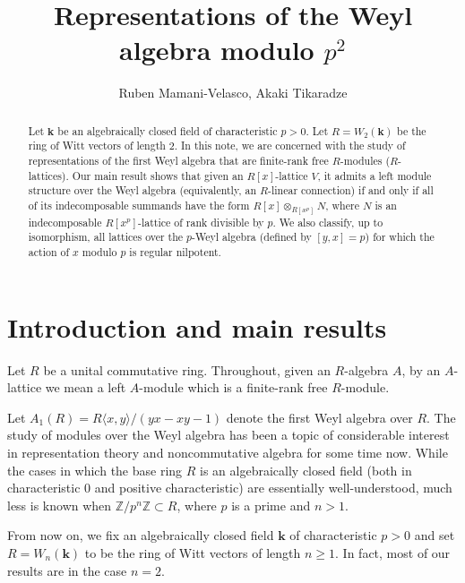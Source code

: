 \documentclass[12pt,letterpaper]{amsart}
\theoremstyle{plain}
\theoremstyle{definition}
\begin{document}
\title{Representations of the Weyl algebra modulo $p^2$}
\author{Ruben Mamani-Velasco, Akaki Tikaradze}
\address{University of Toledo, Department of Mathematics \& Statistics, 
Toledo, OH 43606, USA}

\begin{abstract}
Let $\mathbf{k}$ be an algebraically closed field of characteristic $p>0$. Let $R=W_2(\mathbf{k})$ be the ring of Witt vectors of length $2$.
In this note, we are concerned with the study of representations of the first Weyl algebra that are finite-rank free
$R$-modules ($R$-lattices). 
Our main result shows that given an $R[x]$-lattice $V$, it admits a left module structure over
the Weyl algebra (equivalently, an $R$-linear connection) if and only if all of its indecomposable summands have 
the form $R[x]\otimes_{R[x^p]}N$, where $N$ is an indecomposable $R[x^p]$-lattice of rank divisible by $p$.  
 We also classify, up to isomorphism, all lattices over
the $p$-Weyl algebra (defined by $[y,x]=p$) for which the action of $x$ modulo $p$ is regular nilpotent.
\end{abstract}

\maketitle

\section{Introduction and main results}
Let $R$ be a unital commutative ring. Throughout, given an $R$-algebra $A$, by an $A$-lattice we mean a left $A$-module which is a finite-rank free $R$-module.

Let $A_1(R)=R\langle x,y\rangle/(yx-xy-1)$ denote the first Weyl algebra over $R$. The study of modules over the Weyl algebra has been a topic of considerable interest in representation theory and noncommutative algebra for some time now. While the cases in which the base ring $R$ is an algebraically closed field (both in characteristic 0 and positive characteristic) are essentially
well-understood, much less is known when $\mathbb{Z}/p^n\mathbb{Z}\subset R$, where $p$ is a prime and $n>1$. 

From now on,  we fix an algebraically closed field $\mathbf{k}$ of characteristic $p>0$ and set $R=W_n(\mathbf{k})$  to be the ring of Witt vectors of length $n\geq 1$.  In fact, most of our results are in the case $n=2$. 
\end{document}
